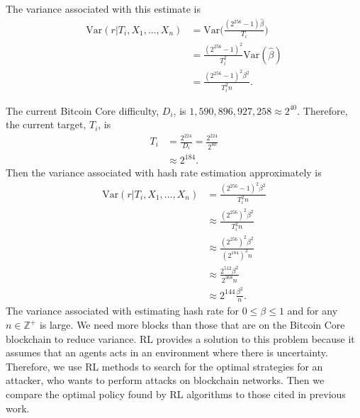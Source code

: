%
The variance associated with this estimate is
\begin{align}
\text{Var}(r|T_i,X_1,...,X_n) &= \text{Var}\bigg(\frac{(2^{256}-1)\hat{\beta}}{T_i}\bigg) \\
&= \frac{(2^{256}-1)^2}{T_i^2} \text{Var}(\hat{\beta}) \\
&= \frac{(2^{256}-1)^2\beta^2}{T_i^2n}.
\end{align}


The current Bitcoin Core difficulty, $D_i$, is $1,590,896,927,258 \approx 2^{40}$. Therefore, the current target, $T_i$, is
\begin{align}
T_i &= \frac{2^{224}}{D_i} = \frac{2^{224}}{2^{40}} \\
&\approx 2^{184}.
\end{align}
Then the variance associated with hash rate estimation approximately is
\begin{align}
\text{Var}(r|T_i,X_1,...,X_n) &= \frac{(2^{256}-1)^2\beta^2}{T_i^2n} \\
&\approx  \frac{(2^{256})^2\beta^2}{T_i^2n} \\
&\approx  \frac{(2^{256})^2\beta^2}{(2^{184})^2n} \\
&\approx  \frac{2^{512}\beta^2}{2^{368}n} \\
&\approx  2^{144}\frac{\beta^2}{n}.
\end{align}
The variance associated with estimating hash rate for $0 \leq \beta \leq 1$ and for any $n \in \mathbb{Z}^+ $ is large. We need more blocks than those that are on the Bitcoin Core blockchain to reduce variance. RL provides a solution to this problem because it assumes that an agents acts in an environment where there is uncertainty. Therefore, we use RL methods to search for the optimal strategies for an attacker, who wants to perform attacks on blockchain networks. Then we compare the optimal policy found by RL algorithms to those cited in previous work.

